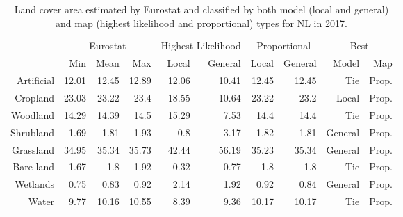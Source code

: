 \begin{table}[H]
\centering
\caption{Land cover area estimated by Eurostat and classified by both model (local and general) and map (highest likelihood and proportional) types for NL in 2017.}

\begin{tabular}{r|rrr|rr|rr|rr}
\toprule
{} & \multicolumn{3}{|c}{Eurostat} & \multicolumn{2}{|c}{Highest Likelihood} & \multicolumn{2}{|c}{Proportional} & \multicolumn{2}{|c}{Best} \\
{} &      Min &   Mean &    Max &              Local & General &        Local & General &    Model &    Map \\
\midrule
Artificial &    12.01 &  12.45 &  12.89 &              12.06 &   10.41 &        12.45 &   12.45 &      Tie &  Prop. \\
Cropland   &    23.03 &  23.22 &   23.4 &              18.55 &   10.64 &        23.22 &    23.2 &    Local &  Prop. \\
Woodland   &    14.29 &  14.39 &   14.5 &              15.29 &    7.53 &         14.4 &    14.4 &      Tie &  Prop. \\
Shrubland  &     1.69 &   1.81 &   1.93 &                0.8 &    3.17 &         1.82 &    1.81 &  General &  Prop. \\
Grassland  &    34.95 &  35.34 &  35.73 &              42.44 &   56.19 &        35.23 &   35.34 &  General &  Prop. \\
Bare land  &     1.67 &    1.8 &   1.92 &               0.32 &    0.77 &          1.8 &     1.8 &      Tie &  Prop. \\
Wetlands   &     0.75 &   0.83 &   0.92 &               2.14 &    1.92 &         0.92 &    0.84 &  General &  Prop. \\
Water      &     9.77 &  10.16 &  10.55 &               8.39 &    9.36 &        10.17 &   10.17 &      Tie &  Prop. \\
\bottomrule
\end{tabular}
\end{table}

